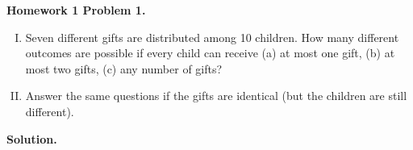 
\textbf{Homework 1 Problem 1.} 

\begin{enumerate}[(I)]

\item Seven different gifts are distributed among 10 children. How many different outcomes are possible if every child can receive (a) at most one gift, (b) at most two gifts, (c) any number of gifts?

\item Answer the same questions if the gifts are identical (but the children are still different).

\end{enumerate}

\textbf{Solution.} 

